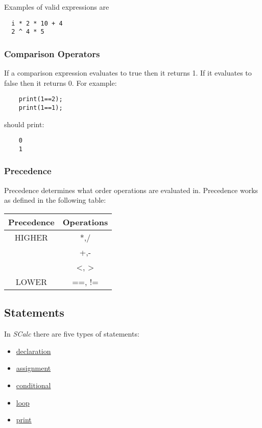 \documentclass{article}
\begin{document}
Examples of valid expressions are
\begin{lstlisting}
  i * 2 * 10 + 4
  2 ^ 4 * 5
\end{lstlisting}

\subsubsection{Comparison Operators}
If a comparison expression evaluates to true then it returns 1. If it evaluates to false then it
returns 0. For example:
\begin{lstlisting}
	print(1==2);
	print(1==1);
\end{lstlisting}
should print:
\begin{lstlisting}
	0
	1
\end{lstlisting}

\subsubsection{Precedence}
Precedence determines what order operations are evaluated in. Precedence works as defined in the
following table:
\begin{center}
	\begin{tabular}{|c|c|}
	\hline
	\textbf{Precedence} & \textbf{Operations} \\
	\hline
	HIGHER
	& *,/ \\
	& +,- \\
	& <, > \\
	LOWER & ==, != \\
	\hline
	\end{tabular}
\end{center}

\subsection {Statements}

In \textit{SCalc} there are five types of statements:

\begin {itemize}
	\item \hyperref[sssec:declaration]{declaration}
	\item \hyperref[sssec:assignment]{assignment}
	\item \hyperref[sssec:conditional]{conditional}
	\item \hyperref[sssec:loop]{loop}
	\item \hyperref[sssec:print]{print}

\end {itemize}
\end{document}
